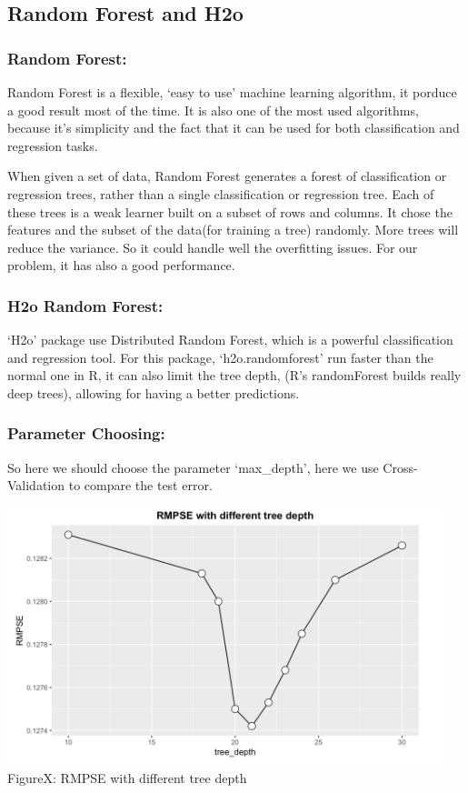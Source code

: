 \documentclass[12pt]{article}
\begin{document}
\subsection{Random Forest and H2o}

	\subsubsection{Random Forest:}
	
	Random Forest is a flexible, `easy to use' machine learning algorithm, it porduce a good result most of the time. It is also one of the most used algorithms, because it's simplicity and the fact that it can be used for both classification and regression tasks.

	When given a set of data, Random Forest generates a forest of classification or regression trees, rather than a single classification or regression tree. Each of these trees is a weak learner built on a subset of rows and columns. It chose the features and the subset of the data(for training a tree) randomly. More trees will reduce the variance. So it could handle well the overfitting issues. For our problem, it has also a good performance.

	\subsubsection{H2o Random Forest:}

	`H2o' package use Distributed Random Forest, which is a powerful classification and regression tool. For this package, `h2o.randomforest' run faster than the normal one in R, it can also limit the tree depth, (R's randomForest builds really deep trees), allowing for having a better predictions.

	\subsubsection{Parameter Choosing:}

	So here we should choose the parameter `max\_depth', here we use Cross-Validation to compare the test error.

	\begin{center}
	\includegraphics[width=5in]{cross.png}\\
	FigureX: RMPSE with different tree depth
	\end{center}
\end{document}

